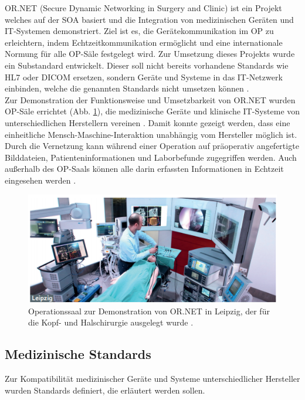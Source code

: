 OR.NET (Secure Dynamic Networking in Surgery and Clinic) ist ein Projekt welches auf der SOA basiert und die Integration von medizinischen Geräten und IT-Systemen demonstriert. Ziel ist es, die Gerätekommunikation im OP zu erleichtern, indem  Echtzeitkommunikation ermöglicht und eine internationale Normung für alle OP-Säle festgelegt wird. Zur Umsetzung dieses Projekts wurde ein Substandard entwickelt. Dieser soll nicht bereits vorhandene Standards wie HL7 oder DICOM ersetzen, sondern Geräte und Systeme in das IT-Netzwerk einbinden, welche die genannten Standards nicht umsetzen können \cite{ORnetWebsite}.\\
Zur Demonstration der Funktionsweise und Umsetzbarkeit von OR.NET wurden OP-Säle errichtet (Abb. \ref{fig:ornet}), die medizinische Geräte und klinische IT-Systeme von unterschiedlichen Herstellern vereinen \cite{ORnet}. Damit konnte gezeigt werden, dass eine einheitliche Mensch-Maschine-Interaktion unabhängig vom Hersteller möglich ist. Durch die Vernetzung kann während einer Operation auf präoperativ angefertigte Bilddateien, Patienteninformationen und Laborbefunde zugegriffen werden. Auch außerhalb des OP-Saals können alle darin erfassten Informationen in Echtzeit eingesehen werden \cite{ORnetWebsite}.

\begin{figure} [t!]
	\includegraphics[scale = 0.8]{Content/Pictures/ornet.png}
	\caption{Operationssaal zur Demonstration von OR.NET in Leipzig, der für die Kopf- und Halschirurgie ausgelegt wurde \cite{ORnetWebsite}.}
	\label{fig:ornet}
\end{figure}

\subsection{Medizinische Standards}

Zur Kompatibilität medizinischer Geräte und Systeme unterschiedlicher Hersteller wurden Standards definiert, die erläutert werden sollen.

